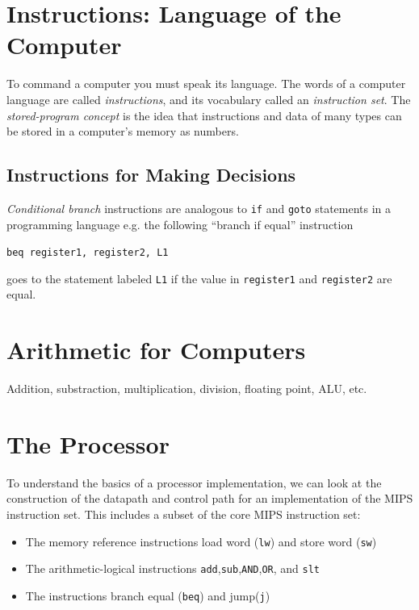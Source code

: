 \documentclass[10pt,a4paper]{article}
\begin{document}
\section{Instructions: Language of the Computer}

To command a computer you must speak its language. The words of a computer language are called \textit{instructions}, and its vocabulary called an \textit{instruction set}. The \textit{stored-program concept} is the idea that instructions and data of many types can be stored in a computer's memory as numbers.

\subsection{Instructions for Making Decisions}

\textit{Conditional branch} instructions are analogous to \verb|if| and \verb|goto| statements in a programming language e.g. the following ``branch if equal'' instruction
\begin{center}
    \verb|beq register1, register2, L1|
\end{center}
goes to the statement labeled \verb|L1| if the value in \verb|register1| and \verb|register2| are equal.


\section{Arithmetic for Computers}

Addition, substraction, multiplication, division, floating point, ALU, etc.

\section{The Processor}

To understand the basics of a processor implementation, we can look at the construction of the datapath and control path for an implementation of the MIPS instruction set. This includes a subset of the core MIPS instruction set:
\begin{itemize}
    \item The memory reference instructions load word (\verb|lw|) and store word (\verb|sw|)
    \item The arithmetic-logical instructions \verb|add|,\verb|sub|,\verb|AND|,\verb|OR|, and \verb|slt|
    \item The instructions branch equal (\verb|beq|) and jump(\verb|j|)
\end{itemize}
\end{document}
